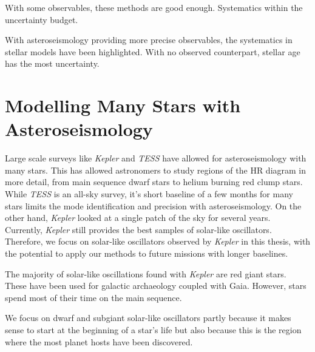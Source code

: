 With some observables, these methods are good enough. Systematics within the uncertainty budget.

With asteroseismology providing more precise observables, the systematics in stellar models have been highlighted. With no observed counterpart, stellar age has the most uncertainty.


\section[Modelling Stars with Asteroseismology]{Modelling Many Stars with Asteroseismology}

Large scale surveys like \emph{Kepler} and \emph{TESS} have allowed for asteroseismology with many stars. This has allowed astronomers to study regions of the HR diagram in more detail, from main sequence dwarf stars to helium burning red clump stars. While \emph{TESS} is an all-sky survey, it's short baseline of a few months for many stars limits the mode identification and precision with asteroseismology. On the other hand, \emph{Kepler} looked at a single patch of the sky for several years. Currently, \emph{Kepler} still provides the best samples of solar-like oscillators. Therefore, we focus on solar-like oscillators observed by \emph{Kepler} in this thesis, with the potential to apply our methods to future missions with longer baselines.

The majority of solar-like oscillations found with \emph{Kepler} are red giant stars. These have been used for galactic archaeology coupled with Gaia. However, stars spend most of their time on the main sequence. 

We focus on dwarf and subgiant solar-like oscillators partly because it makes sense to start at the beginning of a star's life but also because this is the region where the most planet hosts have been discovered.

